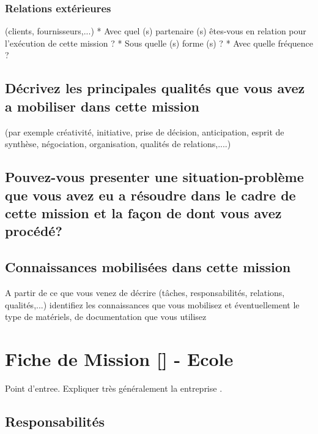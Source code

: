 \documentclass{resume} %
\begin{document}
		\subsubsection{Relations extérieures} (clients, fournisseurs,...)
* Avec quel (s) partenaire (s) êtes-vous en relation pour l'exécution de cette mission ?
* Sous quelle (s) forme (s) ?
* Avec quelle fréquence ?

	\subsection{Décrivez les principales qualités que vous avez a mobiliser dans cette mission}
(par exemple créativité, initiative, prise de décision, anticipation, esprit de synthèse, négociation, organisation, qualités de relations,....)

	\subsection{Pouvez-vous presenter une situation-problème que vous avez eu a résoudre dans le cadre de cette mission et la façon de dont vous avez procédé?}
	\subsection {Connaissances mobilisées dans cette mission }
A partir de ce que vous venez de décrire (tâches, responsabilités, relations, qualités,...) identifiez les connaissances que vous mobilisez et éventuellement le type de matériels, de documentation que vous utilisez





\section{Fiche de Mission [] - Ecole }

	Point d'entree. Expliquer très généralement la entreprise .
	
	\subsection{Responsabilités}
\end{document}
